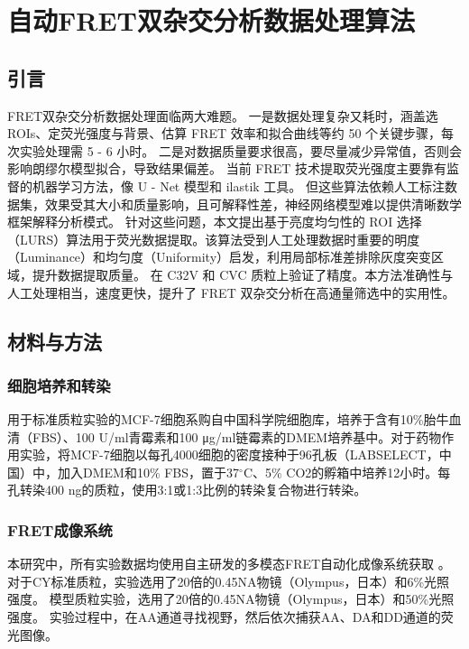 \chapter{自动FRET双杂交分析数据处理算法}

\section{引言}

\ifshowtext
FRET双杂交分析数据处理面临两大难题。
一是数据处理复杂又耗时，涵盖选 ROIs、定荧光强度与背景、估算 FRET 效率和拟合曲线等约 50 个关键步骤，每次实验处理需 5 - 6 小时。
二是对数据质量要求很高，要尽量减少异常值，否则会影响朗缪尔模型拟合，导致结果偏差。
当前 FRET 技术提取荧光强度主要靠有监督的机器学习方法，像 U - Net 模型和 ilastik 工具。
但这些算法依赖人工标注数据集，效果受其大小和质量影响，且可解释性差，神经网络模型难以提供清晰数学框架解释分析模式。
针对这些问题，本文提出基于亮度均匀性的 ROI 选择（LURS）算法用于荧光数据提取。该算法受到人工处理数据时重要的明度（Luminance）和均匀度（Uniformity）启发，利用局部标准差排除灰度突变区域，提升数据提取质量。
在 C32V 和 CVC 质粒上验证了精度。本方法准确性与人工处理相当，速度更快，提升了 FRET 双杂交分析在高通量筛选中的实用性。
\fi

\section{材料与方法}
\subsection{细胞培养和转染}
\label{sec:细胞转染}
\ifshowtext
用于标准质粒实验的MCF-7细胞系购自中国科学院细胞库，培养于含有10\%胎牛血清（FBS）、100 U/ml青霉素和100 μg/ml链霉素的DMEM培养基中。对于药物作用实验，将MCF-7细胞以每孔4000细胞的密度接种于96孔板（LABSELECT，中国）中，加入DMEM和10\% FBS，置于37$^\circ \text{C}$、5\% CO2的孵箱中培养12小时。每孔转染400 ng的质粒，使用3:1或1:3比例的转染复合物进行转染。
\fi

\subsection{FRET成像系统}
\label{sec:成像条件}
\ifshowtext
本研究中，所有实验数据均使用自主研发的多模态FRET自动化成像系统获取 。
对于CY标准质粒，实验选用了20倍的0.45NA物镜（Olympus，日本）和6\%光照强度。
模型质粒实验，选用了20倍的0.45NA物镜（Olympus，日本）和50\%光照强度。
实验过程中，在AA通道寻找视野，然后依次捕获AA、DA和DD通道的荧光图像。

